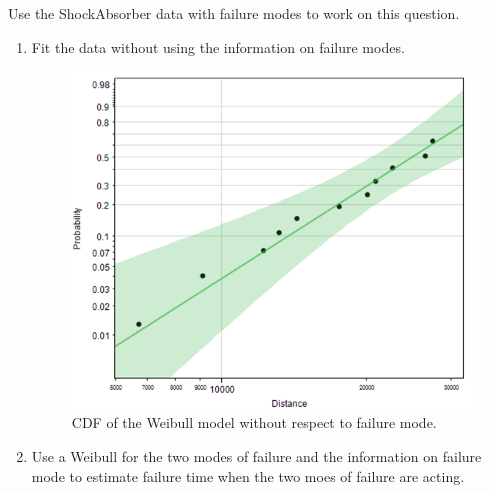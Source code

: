 \documentclass{article}
\begin{document}
\begin{enumerate}
\begin{enumerate}
\begin{enumerate}
  \end{enumerate}
\end{enumerate}

\section{} Use the ShockAbsorber data with failure modes to work on this question.

\begin{enumerate}
  \begin{enumerate}
  \item Fit the data without using the information on failure modes.\\

\begin{center}
        \FloatBarrier
      \begin{figure}
        \centering
        \includegraphics[width = 5in]{problem5_fit.png}
        \caption{CDF of the Weibull model without respect to failure mode.}
      \end{figure}
      \FloatBarrier
  \end{center}
  
  \item Use a Weibull for the two modes of failure and the information on failure mode to estimate failure time when the two moes of failure are acting.\\


\end{enumerate}
\end{enumerate}
\end{enumerate}
\end{document}
